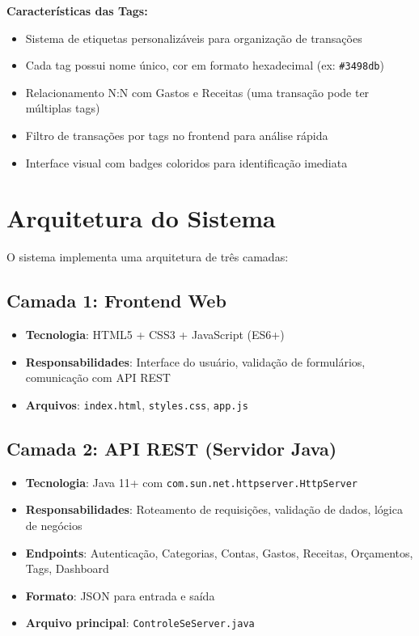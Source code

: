 \documentclass[12pt,a4paper]{article}
\begin{document}
\noindent \textbf{Características das Tags:}
\begin{itemize}
  \item Sistema de etiquetas personalizáveis para organização de transações
  \item Cada tag possui nome único, cor em formato hexadecimal (ex: \texttt{\#3498db})
  \item Relacionamento N:N com Gastos e Receitas (uma transação pode ter múltiplas tags)
  \item Filtro de transações por tags no frontend para análise rápida
  \item Interface visual com badges coloridos para identificação imediata
\end{itemize}

\section{Arquitetura do Sistema}

O sistema implementa uma arquitetura de três camadas:

\subsection*{Camada 1: Frontend Web}
\begin{itemize}
  \item \textbf{Tecnologia}: HTML5 + CSS3 + JavaScript (ES6+)
  \item \textbf{Responsabilidades}: Interface do usuário, validação de formulários, comunicação com API REST
  \item \textbf{Arquivos}: \texttt{index.html}, \texttt{styles.css}, \texttt{app.js}
\end{itemize}

\subsection*{Camada 2: API REST (Servidor Java)}
\begin{itemize}
  \item \textbf{Tecnologia}: Java 11+ com \texttt{com.sun.net.httpserver.HttpServer}
  \item \textbf{Responsabilidades}: Roteamento de requisições, validação de dados, lógica de negócios
  \item \textbf{Endpoints}: Autenticação, Categorias, Contas, Gastos, Receitas, Orçamentos, Tags, Dashboard
  \item \textbf{Formato}: JSON para entrada e saída
  \item \textbf{Arquivo principal}: \texttt{ControleSeServer.java}
\end{itemize}
\end{document}
